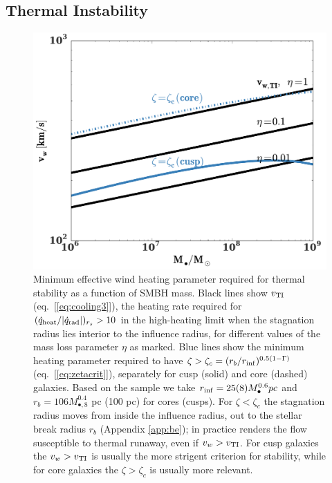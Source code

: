 \documentclass[usenatbib,fleqn]{mn2e}
\newcommand{\rb}{r_b}
\newcommand{\Mbh}[1][]{M_{\bullet#1}}
\newcommand{\Mbheight}{M_{\bullet,8}}
\newcommand{\rinf}{r_{\rm inf}}
\begin{document}
\subsection{Thermal Instability}
\label{sec:instability}


\begin{figure}
  \includegraphics[width=\columnwidth]{ti.pdf}
  \caption{Minimum effective wind heating parameter required for
    thermal stability as a function of SMBH mass.  Black lines show
    $v_{\rm TI}$ (eq.~[\ref{eq:cooling3}]), the heating rate required
    for $(\dot{q}_{\rm heat}/|\dot{q}_{\rm rad}|)_{r_{s}} > 10$ in the
    high-heating limit when the stagnation radius lies interior to the
    influence radius, for different values of the mass loss parameter
    $\eta$ as marked.  Blue lines show the minimum heating parameter
    required to have $\zeta > \zeta_c = (r_{b}/r_{\rm
      inf})^{0.5(1-\Gamma)}$ (eq.~[\ref{eq:zetacrit}]), separately for
    cusp (solid) and core (dashed) galaxies. Based on the
    \citet{LauerFaber+:2007a} sample we take $\rinf=25 (8) \Mbh^{0.6}
    pc$ and $\rb=106 \Mbheight^{0.4}$ pc (100 pc)  for cores (cusps). For
    $\zeta < \zeta_c$ the stagnation radius moves from inside the
    influence radius, out to the stellar break radius $r_b$ (Appendix
    \ref{app:be}); in practice renders the flow susceptible to thermal
    runaway, even if $v_{w} > v_{\rm TI}$.  For cusp galaxies the $v_w
    > v_{\rm TI}$ is usually the more strigent criterion for
    stability, while for core galaxies the $\zeta > \zeta_c$ is
    usually more relevant.}
\label{fig:TI}
\end{figure}
\end{document}
